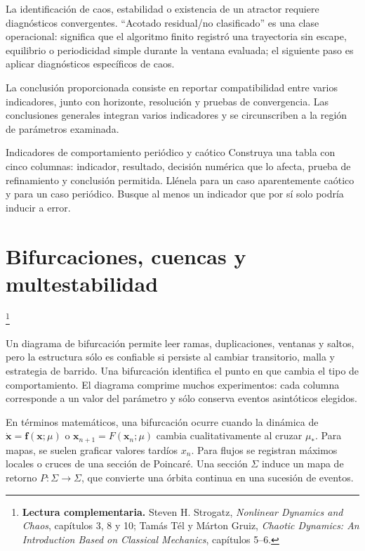 \documentclass[11pt,a4paper]{article}
\newcommand{\lecturaseccion}[1]{%
  \par\noindent{\sffamily\scriptsize\color{Teal}Lectura complementaria}\footnote{%
  \textbf{Lectura complementaria.} #1}\par}
\begin{document}
\begin{warningbox}
La identificación de caos, estabilidad o existencia de un atractor requiere
diagnósticos convergentes. ``Acotado residual/no clasificado'' es una clase operacional:
significa que el algoritmo finito registró una trayectoria sin escape, equilibrio o
periodicidad simple durante la ventana evaluada; el siguiente paso es aplicar
diagnósticos específicos de caos.
\end{warningbox}

La conclusión proporcionada consiste en reportar compatibilidad entre varios
indicadores, junto con horizonte,
resolución y pruebas de convergencia. Las conclusiones generales integran varios indicadores y se circunscriben a la región de parámetros examinada.

\begin{activitybox}{Indicadores de comportamiento periódico y caótico}
Construya una tabla con cinco columnas: indicador, resultado, decisión numérica que
lo afecta, prueba de refinamiento y conclusión permitida. Llénela para un caso
aparentemente caótico y para un caso periódico. Busque al menos un indicador que por
sí solo podría inducir a error.
\end{activitybox}

\section{Bifurcaciones, cuencas y multestabilidad}
\lecturaseccion{Steven H. Strogatz, \emph{Nonlinear Dynamics and Chaos}, capítulos 3, 8 y 10; Tamás Tél y Márton Gruiz, \emph{Chaotic Dynamics: An Introduction Based on Classical Mechanics}, capítulos 5--6.}

Un diagrama de bifurcación permite leer ramas, duplicaciones, ventanas y saltos, pero
la estructura sólo es confiable si persiste al cambiar transitorio, malla y estrategia
de barrido. Una bifurcación identifica el punto en que cambia el tipo de comportamiento.
El diagrama comprime muchos experimentos:
cada columna corresponde a un valor del parámetro y sólo conserva eventos
asintóticos elegidos.

En términos matemáticos, una bifurcación ocurre cuando la dinámica de
$\dot{\mathbf{x}}=\mathbf f(\mathbf{x};\mu)$ o
$\mathbf{x}_{n+1}=F(\mathbf{x}_n;\mu)$ cambia cualitativamente al cruzar
$\mu_*$. Para mapas, se suelen graficar valores tardíos $x_n$. Para flujos se
registran máximos locales o cruces de una sección de Poincaré. Una sección
$\Sigma$ induce un mapa de retorno $P:\Sigma\to\Sigma$, que convierte una
órbita continua en una sucesión de eventos.
\end{document}
